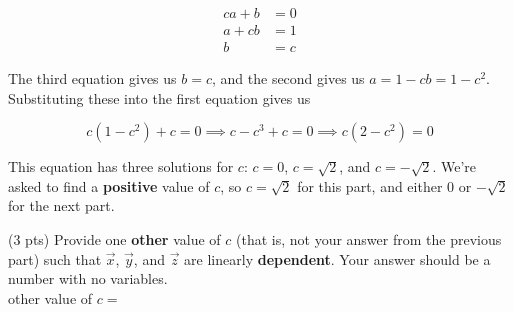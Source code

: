 \documentclass[11pt]{article}
\begin{document}
\begin{prob}
\begin{subprob}
\begin{solution}
\begin{align*}
  c a + b &= 0 \\
  a + c b &= 1 \\
  b &= c
\end{align*}

The third equation gives us $b = c$, and the second gives us $a = 1 - cb = 1 - c^2$. Substituting these into the first equation gives us

$$c(1 - c^2) + c = 0 \implies c - c^3 + c = 0 \implies c(2 - c^2) = 0$$

This equation has three solutions for $c$: $c = 0$, $c = \sqrt{2}$, and $c = -\sqrt{2}$. We're asked to find a \textbf{positive} value of $c$, so $c = \sqrt{2}$ for this part, and either $0$ or $-\sqrt{2}$ for the next part.

\end{solution}

\end{subprob}

\begin{subprob}(3 pts) Provide one \textbf{other} value of $c$ (that is, not your answer from the previous part) such that $\vec x$, $\vec y$, and $\vec z$ are linearly \textbf{dependent}. Your answer should be a number with no variables. \\

other value of $c = $ 

\end{subprob}


\end{prob}
\end{document}

